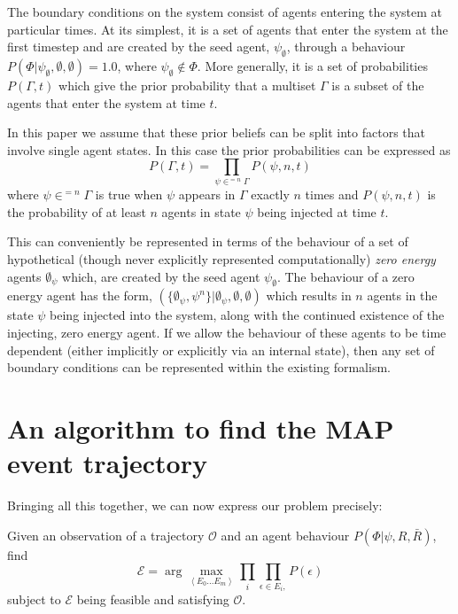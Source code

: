 \documentclass[sigconf]{aamas}
\begin{document}
The boundary conditions on the system consist of agents entering the system at particular times. At its simplest, it is a set of agents that enter the system at the first timestep and are created by the seed agent, $\psi_\emptyset$, through a behaviour $P(\Phi|\psi_\emptyset,\emptyset,\emptyset)=1.0$, where $\psi_\emptyset \notin \Phi$. More generally, it is a set of probabilities $P(\Gamma,t)$ which give the prior probability that a multiset $\Gamma$ is a subset of the agents that enter the system at time $t$.

In this paper we assume that these prior beliefs can be split into factors that involve single agent states. In this case the prior probabilities can be expressed as
\[
P(\Gamma,t) = \prod_{\psi \in^{=n} \Gamma} P(\psi,n,t)
\]
where $\psi\in^{=n}\Gamma$ is true when $\psi$ appears in $\Gamma$ exactly $n$ times and $P(\psi,n,t)$ is the probability of at least $n$ agents in state $\psi$ being injected at time $t$. 

This can conveniently be represented in terms of the behaviour of a set of hypothetical (though never explicitly represented computationally) \textit{zero energy} agents $\emptyset_\psi$ which, are created by the seed agent $\psi_\emptyset$. The behaviour of a zero energy agent has the form, $(\{\emptyset_\psi, \psi^n\}|\emptyset_\psi,\emptyset,\emptyset)$ which results in $n$ agents in the state $\psi$ being injected into the system, along with the continued existence of the injecting, zero energy agent. If we allow the behaviour of these agents to be time dependent (either implicitly or explicitly via an internal state), then any set of boundary conditions can be represented within the existing formalism.

\section{An algorithm to find the MAP event trajectory}

Bringing all this together, we can now express our problem precisely:

Given an observation of a trajectory $\mathcal{O}$ and an agent behaviour $P(\Phi|\psi,R,\bar{R})$, find
\begin{equation}
\mathcal{E} = \arg\max_{\left<E_0...E_m\right>}\prod_{i}\prod_{\epsilon\in E_i, }P(\epsilon)
\end{equation}
subject to $\mathcal{E}$ being feasible and satisfying $\mathcal{O}$.
\end{document}
